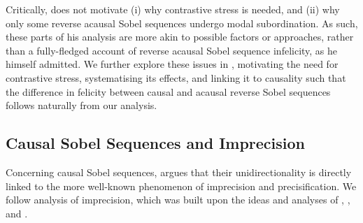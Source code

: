 Critically, \textcite{Klecha2014,Klecha2015} does not motivate (i) why contrastive stress is needed, and (ii) why only some reverse acausal Sobel sequences undergo modal subordination. As such, these parts of his analysis are more akin to possible factors or approaches, rather than a fully-fledged account of reverse acausal Sobel sequence infelicity, as he himself admitted. We further explore these issues in , motivating the need for contrastive stress, systematising its effects, and linking it to causality such that the difference in felicity between causal and acausal reverse Sobel sequences follows naturally from our analysis.

\subsection{Causal Sobel Sequences and Imprecision}
Concerning causal Sobel sequences, \textcite{Klecha2014,Klecha2015} argues that their unidirectionality is directly linked to the more well-known phenomenon of imprecision and precisification.
We follow  analysis of imprecision, which was built upon the ideas and analyses of \textcite{Lasersohn1999}, \textcite{Krifka2009}, and \textcite{Lauer2012}.

